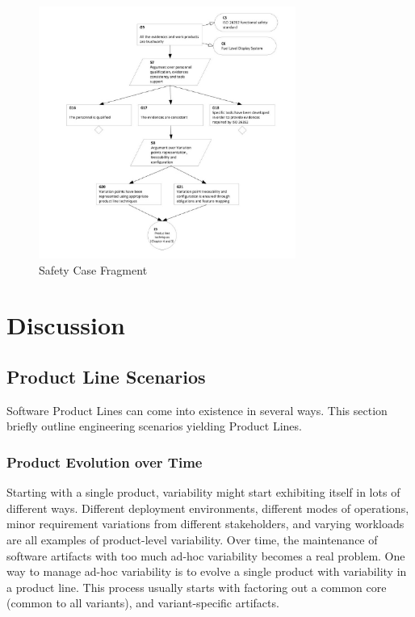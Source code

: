 \documentclass[11pt]{article}
\begin{document}
\begin{figure}
  \centering
  \includegraphics[width=0.75\textwidth]{safetyCase}
  \caption{Safety Case Fragment}
\end{figure}

%
%
%
%
%
%
%
%
%
%
%
%
%
%
%
%
%
%
%
%

\section{Discussion}

\subsection{Product Line Scenarios}

Software Product Lines can come into existence in several ways. This section briefly outline engineering scenarios yielding Product Lines.

\subsubsection{Product Evolution over Time}

Starting with a single product, variability might start exhibiting itself in lots of different ways. Different deployment environments, different modes of operations, minor requirement variations from different stakeholders, and varying workloads are all examples of product-level variability. Over time, the maintenance of software artifacts with too much ad-hoc variability becomes a real problem. 
One way to manage ad-hoc variability is to evolve a single product with variability in a product line. This process usually starts with factoring out a common core (common to all variants), and variant-specific artifacts.
\end{document}
